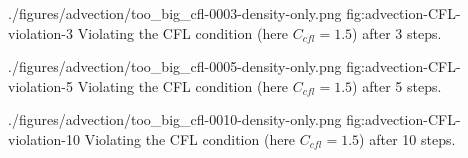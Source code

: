 \quickfigcap
	{./figures/advection/too_big_cfl-0003-density-only.png}
	{fig:advection-CFL-violation-3}
	{Violating the CFL condition (here $C_{cfl} = 1.5$) after 3 steps.}

\quickfigcap
	{./figures/advection/too_big_cfl-0005-density-only.png}
	{fig:advection-CFL-violation-5}
	{Violating the CFL condition (here $C_{cfl} = 1.5$) after 5 steps.}

\quickfigcap
	{./figures/advection/too_big_cfl-0010-density-only.png}
	{fig:advection-CFL-violation-10}
	{Violating the CFL condition (here $C_{cfl} = 1.5$) after 10 steps.}

